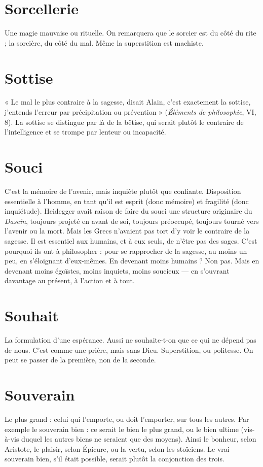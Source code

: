 \section{Sorcellerie}
Une magie mauvaise ou rituelle. On remarquera que le sorcier
est du côté du rite ; la sorcière, du côté du mal. Même
la superstition est machiste.

\section{Sottise}
« Le mal le plus contraire à la sagesse, disait Alain, c’est exactement
la sottise, j'entends l’erreur par précipitation ou prévention » ({\it Éléments
de philosophie}, VI, 8). La sottise se distingue par là de la bêtise, qui serait
plutôt le contraire de l'intelligence et se trompe par lenteur ou incapacité.

\section{Souci}
C’est la mémoire de l’avenir, mais inquiète plutôt que confiante.
Disposition essentielle à l’homme, en tant qu’il est esprit (donc
mémoire) et fragilité (donc inquiétude). Heidegger avait raison de faire du
souci une structure originaire du {\it Dasein}, toujours projeté en avant de soi, toujours
préoccupé, toujours tourné vers l’avenir ou la mort. Mais les Grecs
n'avaient pas tort d’y voir le contraire de la sagesse. Il est essentiel aux humains,
et à eux seuls, de n’être pas des sages. C’est pourquoi ils ont à philosopher : pour
se rapprocher de la sagesse, au moins un peu, en s’éloignant d’eux-mêmes. En
devenant moins humains ? Non pas. Mais en devenant moins égoïstes, moins
inquiets, moins soucieux — en s’ouvrant davantage au présent, à l’action et à tout.

\section{Souhait}
La formulation d’une espérance. Aussi ne souhaite-t-on que ce
qui ne dépend pas de nous. C’est comme une prière, mais sans
Dieu. Superstition, ou politesse. On peut se passer de la première, non de la
seconde.

\section{Souverain}
Le plus grand : celui qui l'emporte, ou doit l'emporter, sur
tous les autres. Par exemple le souverain bien : ce serait le bien
le plus grand, ou le bien ultime (vis-à-vis duquel les autres biens ne seraient que
des moyens). Ainsi le bonheur, selon Aristote, le plaisir, selon Épicure, ou la
vertu, selon les stoïciens. Le vrai souverain bien, s’il était possible, serait plutôt
la conjonction des trois.

